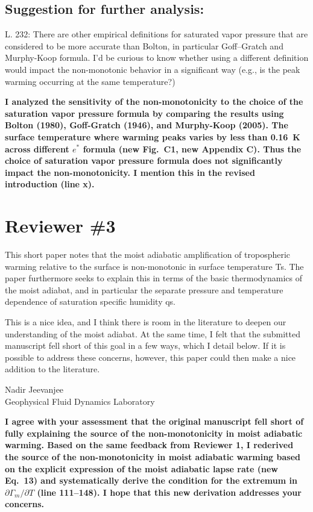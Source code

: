 \documentclass{article}
\begin{document}
\subsection{Suggestion for further analysis:}
\par
L. 232: There are other empirical definitions for saturated vapor pressure that are considered to be more accurate than Bolton, in particular Goff–Gratch and Murphy-Koop formula. I'd be curious to know whether using a different definition would impact the non-monotonic behavior in a significant way (e.g., is the peak warming occurring at the same temperature?)
\par
\textbf{I analyzed the sensitivity of the non-monotonicity to the choice of the saturation vapor pressure formula by comparing the results using Bolton (1980), Goff-Gratch (1946), and Murphy-Koop (2005). The surface temperature where warming peaks varies by less than 0.16~K across different $e^*$ formula (new Fig.~C1, new Appendix C). Thus the choice of saturation vapor pressure formula does not significantly impact the non-monotonicity. I mention this in the revised introduction (line x).}
\par
\section{Reviewer \#3}

This short paper notes that the moist adiabatic amplification of tropospheric warming relative to the surface is non-monotonic in surface temperature Ts. The paper furthermore seeks to explain this in terms of the basic thermodynamics of the moist adiabat, and in particular the separate pressure and temperature dependence of saturation specific humidity qs.

This is a nice idea, and I think there is room in the literature to deepen our understanding of the moist adiabat. At the same time, I felt that the submitted manuscript fell short of this goal in a few ways, which I detail below. If it is possible to address these concerns, however, this paper could then make a nice addition to the literature.

Nadir Jeevanjee \\
Geophysical Fluid Dynamics Laboratory

\textbf{I agree with your assessment that the original manuscript fell short of fully explaining the source of the non-monotonicity in moist adiabatic warming. Based on the same feedback from Reviewer 1, I rederived the source of the non-monotonicity in moist adiabatic warming based on the explicit expression of the moist adiabatic lapse rate (new Eq.~13) and systematically derive the condition for the extremum in $\partial\Gamma_m/\partial T$ (line 111--148). I hope that this new derivation addresses your concerns.}
\end{document}
